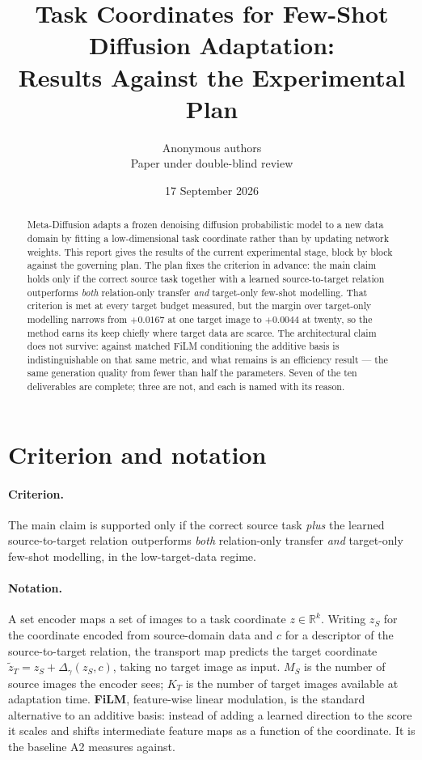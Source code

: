 \documentclass{article}
\title{Task Coordinates for Few-Shot Diffusion Adaptation:\\
Results Against the Experimental Plan}
\author{Anonymous authors\\Paper under double-blind review}
\date{17 September 2026}
\begin{document}
\maketitle

\begin{abstract}
Meta-Diffusion adapts a frozen denoising diffusion probabilistic model to a new data domain
by fitting a low-dimensional task coordinate rather than by updating network weights. This
report gives the results of the current experimental stage, block by block against the
governing plan. The plan fixes the criterion in advance: the main claim holds only if the
correct source task together with a learned source-to-target relation outperforms
\emph{both} relation-only transfer \emph{and} target-only few-shot modelling. That criterion
is met at every target budget measured, but the margin over target-only modelling narrows
from $+0.0167$ at one target image to $+0.0044$ at twenty, so the method earns its keep
chiefly where target data are scarce. The architectural claim does not survive: against
matched FiLM conditioning the additive basis is indistinguishable on that same metric,
and what remains is an efficiency result --- the same generation quality from fewer than half
the parameters. Seven of the ten deliverables are complete; three are not, and each is named
with its reason.
\end{abstract}

\section{Criterion and notation}

\paragraph{Criterion.} The main claim is supported only if the correct source task
\emph{plus} the learned source-to-target relation outperforms \emph{both} relation-only
transfer \emph{and} target-only few-shot modelling, in the low-target-data regime.

\paragraph{Notation.} A set encoder maps a set of images to a task coordinate
$z \in \mathbb{R}^{k}$. Writing $z_S$ for the coordinate encoded from source-domain data and
$c$ for a descriptor of the source-to-target relation, the transport map predicts the target
coordinate $\tilde{z}_T = z_S + \Delta_\gamma(z_S, c)$, taking no target image as input.
$M_S$ is the number of source images the encoder sees; $K_T$ is the number of target images
available at adaptation time. \textbf{FiLM}, feature-wise linear modulation, is the standard
alternative to an additive basis: instead of adding a learned direction to the score it
scales and shifts intermediate feature maps as a function of the coordinate. It is the
baseline A2 measures against.
\end{document}
